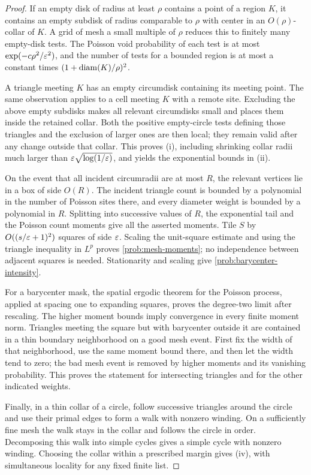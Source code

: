 \begin{proof}
If an empty disk of radius at least $\rho$ contains a point of a region
$K$, it contains an empty subdisk of radius comparable to $\rho$ with
center in an $O(\rho)$-collar of $K$.  A grid of mesh a small multiple of
$\rho$ reduces this to finitely many empty-disk tests.  The Poisson void
probability of each test is at most $\exp(-c\rho^2/\varepsilon^2)$, and the
number of tests for a bounded region is at most a constant times
$(1+\operatorname{diam}(K)/\rho)^2$.

A triangle meeting $K$ has an empty circumdisk containing its meeting
point.  The same observation applies to a cell meeting $K$ with a remote
site.  Excluding the above empty subdisks makes all relevant circumdisks
small and places them inside the retained collar.  Both the positive
empty-circle tests defining those triangles and the exclusion of larger
ones are then local; they remain valid after any change outside that
collar.  This proves (i), including shrinking collar radii much larger
than $\varepsilon\sqrt{\log(1/\varepsilon)}$, and yields the exponential bounds in (ii).

On the event that all incident circumradii are at most $R$, the relevant
vertices lie in a box of side $O(R)$.  The incident triangle count is
bounded by a polynomial in the number of Poisson sites there, and every
diameter weight is bounded by a polynomial in $R$.  Splitting into
successive values of $R$, the exponential tail and the Poisson count
moments give all the asserted moments.  Tile $S$ by $O((s/\varepsilon+1)^2)$
squares of side $\varepsilon$.  Scaling the unit-square estimate and using the
triangle inequality in $L^p$ proves \eqref{prob:mesh-moments}; no
independence between adjacent squares is needed.  Stationarity and scaling
give \eqref{prob:barycenter-intensity}.

For a barycenter mask, the spatial ergodic theorem for the Poisson process,
applied at spacing one to expanding squares, proves the degree-two limit
after rescaling.  The higher moment bounds imply convergence in every
finite moment norm.  Triangles meeting the square but with barycenter
outside it are contained in a thin boundary neighborhood on a good mesh
event.  First fix the width of that neighborhood, use the same moment
bound there, and then let the width tend to zero; the bad mesh event is
removed by higher moments and its vanishing probability.  This proves the
statement for intersecting triangles and for the other indicated weights.

Finally, in a thin collar of a circle, follow successive triangles around
the circle and use their primal edges to form a walk with nonzero winding.
On a sufficiently fine mesh the walk stays in the collar and follows the
circle in order.  Decomposing this walk into simple cycles gives a simple
cycle with nonzero winding.  Choosing the collar within a prescribed
margin gives (iv), with simultaneous locality for any fixed finite list.
\end{proof}

